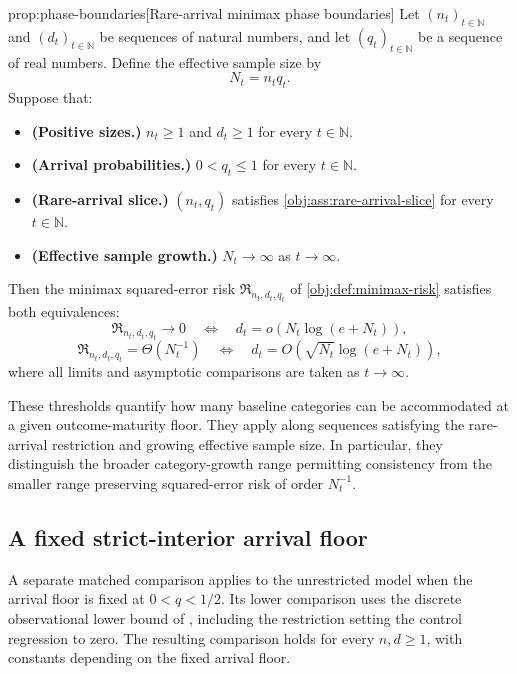 \begin{propositionv}{prop:phase-boundaries}[Rare-arrival minimax phase boundaries]
Let \((n_t)_{t\in\mathbb N}\) and \((d_t)_{t\in\mathbb N}\) be sequences of natural numbers, and let \((q_t)_{t\in\mathbb N}\) be a sequence of real numbers. Define the effective sample size by
\[
N_t=n_tq_t.
\]
Suppose that:
\begin{itemize}
\item \textbf{(Positive sizes.)} \(n_t\ge 1\) and \(d_t\ge 1\) for every \(t\in\mathbb N\).
\item \textbf{(Arrival probabilities.)} \(0<q_t\le 1\) for every \(t\in\mathbb N\).
\item \textbf{(Rare-arrival slice.)} \((n_t,q_t)\) satisfies \cref{obj:ass:rare-arrival-slice} for every \(t\in\mathbb N\).
\item \textbf{(Effective sample growth.)} \(N_t\to\infty\) as \(t\to\infty\).
\end{itemize}
Then the minimax squared-error risk \(\mathfrak R_{n_t,d_t,q_t}\) of \cref{obj:def:minimax-risk} satisfies both equivalences:
\[
\mathfrak R_{n_t,d_t,q_t}\longrightarrow 0
\quad\Longleftrightarrow\quad
d_t=o\!\left(N_t\log(e+N_t)\right),
\]
\[
\mathfrak R_{n_t,d_t,q_t}=\Theta\!\left(N_t^{-1}\right)
\quad\Longleftrightarrow\quad
d_t=O\!\left(\sqrt{N_t}\log(e+N_t)\right),
\]
where all limits and asymptotic comparisons are taken as \(t\to\infty\).
\end{propositionv}

These thresholds quantify how many baseline categories can be accommodated at a given outcome-maturity floor. They apply along sequences satisfying the rare-arrival restriction and growing effective sample size. In particular, they distinguish the broader category-growth range permitting consistency from the smaller range preserving squared-error risk of order \(N_t^{-1}\).

\subsection{A fixed strict-interior arrival floor}

A separate matched comparison applies to the unrestricted model when the arrival floor is fixed at \(0<q<1/2\). Its lower comparison uses the discrete observational lower bound of \citet[Theorem~2, Section~3.2, p.~9, and its proof in Section~C.5, pp.~39--44]{ZengBalakrishnanHanKennedy2026}, including the restriction setting the control regression to zero. The resulting comparison holds for every \(n,d\ge1\), with constants depending on the fixed arrival floor.

